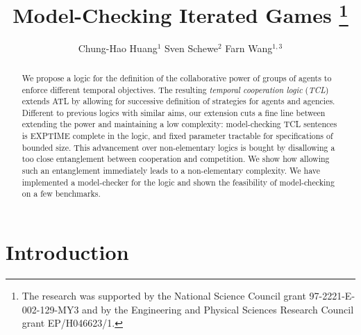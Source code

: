 \documentclass{llncs}
\begin{document}
\title{Model-Checking Iterated Games%
\thanks{The research was supported
by the National Science Council %
grant 97-2221-E-002-129-MY3 and 
by the Engineering and Physical Sciences Research Council %
grant EP/H046623/1.}}

\author{Chung-Hao Huang$^{1}$ 
\hspace*{5mm} Sven Schewe{$^2$} 
\hspace*{5mm} Farn Wang$^{1,3}$ 
}



\maketitle
\thispagestyle{empty}
\pagestyle{plain}

\begin{abstract}
We propose a logic for the definition of the collaborative power of groups of agents to enforce different temporal objectives.
The resulting {\em temporal cooperation logic} ({\em TCL}) extends ATL by allowing for successive definition of strategies for agents and agencies.
Different to previous logics with similar aims, our extension cuts a fine line between extending the power and maintaining a low complexity:
model-checking TCL sentences is EXPTIME complete in the logic, and fixed parameter tractable for specifications of bounded size.
This advancement over non-elementary logics is bought by disallowing 
a too close entanglement between cooperation and competition.
We show how allowing such an entanglement immediately leads to a non-elementary complexity.
%
We have implemented a model-checker for the logic and shown the feasibility of model-checking on a few benchmarks.
\end{abstract}




\section{Introduction}
\end{document}
